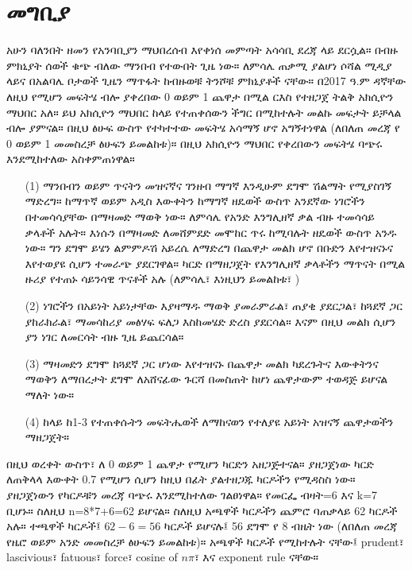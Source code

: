 \documentclass[a4paper,12pt]{article}
\newenvironment{geez}{\geezfont}{}
\theoremstyle{mystyle}
\numberwithin{equation}{section}
\numberwithin{theorem}{section}
\numberwithin{proposition}{section}
\numberwithin{example}{section}
\numberwithin{remark}{section}
\numberwithin{lemma}{section}
\numberwithin{corollary}{section}
\numberwithin{definition}{section}
\numberwithin{amharicdefinition}{section}
\begin{document}
\section{\begin{geez}መግቢያ\end{geez}}
\label{S:2}
አሁን ባለንበት ዘመን የአንባቢያን ማህበረሰብ እየቀነሰ መምጣት አሳሳቢ ደረጃ ላይ ደርሷል። በብዙ ምክኒያት ሰወች ቁጭ ብለው
ማንበብ የተውበት ጊዜ ነው። ለምሳሌ ጠቃሚ ያልሆነ ሶሻል
ሚዲያ ላይና በአልባሌ ቦታወች ጊዜን ማጥፋት ከብዙወቹ ትንሾቹ ምክኒያቶች ናቸው። በ2017 ዓ.ም ዳኛቸው ለዚህ የሚሆን መፍትሄ ብሎ ያቀረበው 0 ወይም 1 ጨዋታ በሚል ርእስ የተዘጋጀ ትልቅ አክሲዮን ማህበር አለ። ይህ አክሲዮን ማህበር ከላይ የተጠቀሰውን ችግር በሚከተሉት መልኩ መፍታት ይቻላል ብሎ ያምናል። በዚህ ፅሁፍ ውስጥ የተካተተው መፍትሄ አሳማኝ ሆኖ አግኝተነዋል (ለበለጠ መረጃ የ 0 ወይም 1 መመስረቻ ፅሁፍን ይመልከቱ)። በዚህ አክሲዮን ማህበር የቀረበውን መፍትሄ ባጭሩ እንደሚከተለው አስቀምጠነዋል። 
\begin{enumerate}
\item[(1)] ማንበብን ወይም ጥናትን መዝናኛና ገንዘብ ማግኛ እንዲሁም ደግሞ ሽልማት የሚያስገኝ ማድረግ። ከማጥኛ ወይም አዲስ እውቀትን ከማግኛ  ዘዴወች ውስጥ አንደኛው ነገሮችን በተመሳሳያቸው በማዛመድ ማወቅ ነው። ለምሳሌ የአንድ እንግሊዘኛ ቃል ብዙ ተመሳሳይ ቃላቶች አሉት። እነሱን በማዛመድ ለመሸምደድ መሞከር ጥሩ ከሚባሉት ዘዴወች ውስጥ አንዱ ነው። ግን ደግሞ ይሄን ልምምዶሽ አይረሴ ለማድረግ በጨዋታ መልክ ሆኖ በቡድን እየተዝናኑና እየተወያዩ ሲሆን ተመራጭ ያደርገዋል።
ካርድ በማዘጋጀት የእንግሊዘኛ ቃላቶችን ማጥናት በሚል ዙሪያ የተጠኑ ሳይንሳዊ ጥናቶች አሉ (ለምሳሌ፣ እነዚህን ይመልከቱ፣ 
\cite{aslan2011teaching,azabdaftari2012comparing,bryson2012using,kosim2013improving,
 nikoopour2014vocabulary,
nugroho2012improving,
saputri2017improving,senzaki2017reinventing,sitompul2013teaching,
wahyuni2014flashcards})
\item[(2)] ነገሮችን በአይነት አይነታቸው እያዛማዱ ማወቅ ያመራምራል፣ ጠያቂ ያደርጋል፣ ከጓደኛ ጋር ያከራክራል፣ ማመሳከሪያ መፅሃፍ ፍለጋ እስከመሄድ ድረስ ያደርሳል። እናም በዚህ መልክ ሲሆን ያን ነገር ለመርሳት ብዙ ጊዜ ይጨርሳል። 
\item[(3)] ማዛመድን ደግሞ ከጓደኛ ጋር ሆነው እየተዝናኑ በጨዋታ መልክ ካደረጉትና እውቀትንና ማወቅን ለማበረታት ደግሞ ለአሸናፊው ጉርሻ በመስጠት ከሆነ ጨዋታውም ተወዳጅ ይሆናል ማለት ነው።
\item[(4)] ከላይ ከ1-3 የተጠቀሱትን መፍትሔወች ለማከናወን የተለያዩ አይነት አዝናኝ ጨዋታወችን ማዘጋጀት።
\end{enumerate}
በዚህ ወረቀት ውስጥ፣ ለ 0 ወይም 1 ጨዋታ የሚሆን ካርድን አዘጋጅተናል። ያዘጋጀነው ካርድ ለጠቅላላ እውቀት 0.7 የሚሆን ሲሆን ከዚህ በፊት ያልተዘጋጁ ካርዶችን የሚዳስስ ነው። ያዘጋጀነውን የካርዶቹን መረጃ ባጭሩ እንደሚከተለው ገልፀነዋል። የመርፌ ብዛት=6 እና k=7 ቢሆኑ። ስለዚህ n=8*7+6=62 ይሆናል። ስለዚህ አጫዋች ካርዶችን ጨምሮ ባጠቃላይ 62 ካርዶች አሉ። ተጫዋች ካርዶች፤ $62-6=56$ ካርዶች ይሆናሉ፤ 56 ደግሞ የ 8 ብዜት ነው (ለበለጠ መረጃ የዜሮ ወይም አንድ መመስረቻ ፅሁፍን ይመልከቱ)።  አጫዋች ካርዶች የሚከተሉት ናቸው፤ prudent፣ lascivious፣ fatuous፣ force፣ cosine of $n\pi$፣ እና exponent rule ናቸው።
\end{document}
